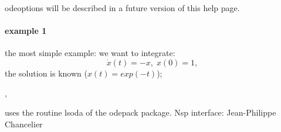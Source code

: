 \begin{mandescription}
odeoptions will be described in a future version of this help page.

\end{mandescription} 

\begin{examples}
  
\paragraph{example 1} the most simple example: we want to integrate:
$$
  \dot{x}(t) = - x, \; x(0) = 1, 
$$ 
the solution is known ($x(t) = exp(-t)$);
\begin{program}
\end{program}
 
\end{examples}

\begin{manseealso}
  ,   
\end{manseealso}

\begin{authors}
  uses the routine lsoda of the odepack package. Nsp interface: Jean-Philippe Chancelier
\end{authors}
